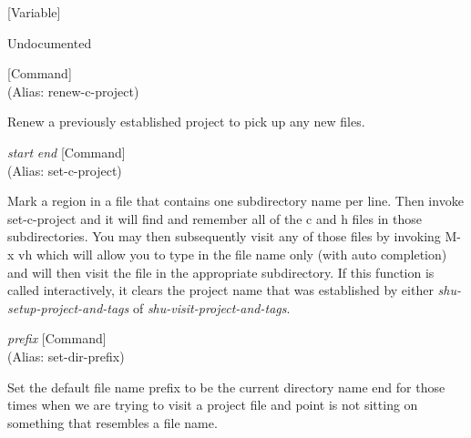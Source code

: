 \vspace{1em}
\noindent
{}
\usebox{\funcname}
 \hfill [Variable]

\begin{doc-string}
Undocumented
\end{doc-string}

\vspace{1em}
\noindent
{}
\usebox{\funcname}
 \hfill [Command]\\%
 (Alias: renew-c-project)

\begin{doc-string}
Renew a previously established project to pick up any new files.
\end{doc-string}

\vspace{1em}
\noindent
{}
\usebox{\funcname}\emph{start} \emph{end}
 \hfill [Command]\\%
 (Alias: set-c-project)

\begin{doc-string}
Mark a region in a file that contains one subdirectory name per line.  Then
invoke set-c-project and it will find and remember all of the c and h files in
those subdirectories.  You may then subsequently visit any of those files by
invoking M-x vh which will allow you to type in the file name only (with auto
completion) and will then visit the file in the appropriate subdirectory.  If
this function is called interactively, it clears the project name that was
established by either \emph{shu-setup-project-and-tags} of \emph{shu-visit-project-and-tags}.
\end{doc-string}

\vspace{1em}
\noindent
{}
\usebox{\funcname}\emph{prefix}
 \hfill [Command]\\%
 (Alias: set-dir-prefix)

\begin{doc-string}
Set the default file name prefix to be the current directory name end for those
times when we are trying to visit a project file and point is not sitting on
something that resembles a file name.
\end{doc-string}

